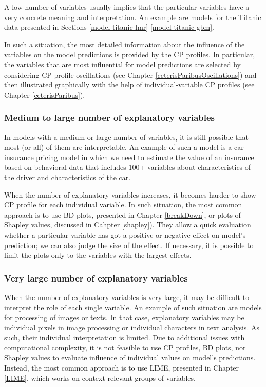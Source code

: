 \documentclass[12pt,]{krantz}
\begin{document}
A low number of variables usually implies that the particular variables have a very concrete meaning and interpretation. An example are models for the Titanic data presented in Sections \ref{model-titanic-lmr}-\ref{model-titanic-gbm}.

In such a situation, the most detailed information about the influence of the variables on the model predictions is provided by the CP profiles. In particular, the variables that are most influential for model predictions are selected by considering CP-profile oscillations (see Chapter \ref{ceterisParibusOscillations}) and then illustrated graphically with the help of individual-variable CP profiles (see Chapter \ref{ceterisParibus}).

\hypertarget{medium-to-large-number-of-explanatory-variables}{%
\subsubsection{Medium to large number of explanatory variables}\label{medium-to-large-number-of-explanatory-variables}}

In models with a medium or large number of variables, it is still possible that most (or all) of them are interpretable. An example of such a model is a car-insurance pricing model in which we need to estimate the value of an insurance based on behavioral data that includes 100+ variables about characteristics of the driver and characteristics of the car.

When the number of explanatory variables increases, it becomes harder to show CP profile for each individual variable. In such situation, the most common approach is to use BD plots, presented in Chapter \ref{breakDown}, or plots of Shapley values, discussed in Cahpter \ref{shapley}). They allow a quick evaluation whether a particular variable has got a positive or negative effect on model's prediction; we can also judge the size of the effect. If necessary, it is possible to limit the plots only to the variables with the largest effects.

\hypertarget{very-large-number-of-explanatory-variables}{%
\subsubsection{Very large number of explanatory variables}\label{very-large-number-of-explanatory-variables}}

When the number of explanatory variables is very large, it may be difficult to interpret the role of each single variable. An example of such situation are models for processing of images or texts. In that case, explanatory variables may be individual pixels in image processing or individual characters in text analysis. As such, their individual interpretation is limited. Due to additional issues with computational complexity, it is not feasible to use CP profiles, BD plots, nor Shapley values to evaluate influence of individual values on model's predictions. Instead, the most common approach is to use LIME, presented in Chapter \ref{LIME}, which works on context-relevant groups of variables.
\end{document}
